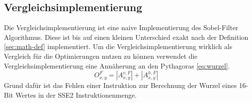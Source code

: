 \documentclass[course=erap]{aspdoc}
\begin{document}
\subsection{Vergleichsimplementierung}
\label{sec:vergleichsimplementierung}
Die Vergleichsimplementierung ist eine naive Implementierung des Sobel-Filter Algorithmus.
Diese ist bis auf einen kleinen Unterschied exakt nach der Definition \ref{sec:math-def} implementiert.
Um die Vergleichsimplementierung wirklich als Vergleich für die Optimierungen nutzen zu können verwendet die Vergleichsimplementierung eine Annäherung an den Pythagoras \ref{eq:wurzel}.
\begin{equation}
    O^{F}_{x,y} = \left | A^{v,F}_{x,y} \right | + \left | A^{h,F}_{x,y} \right |
    \label{eq:betrag}
\end{equation}
Grund dafür ist das Fehlen einer Instruktion zur Berechnung der Wurzel eines 16-Bit Wertes in der SSE2 Instruktionenmenge.
\end{document}
